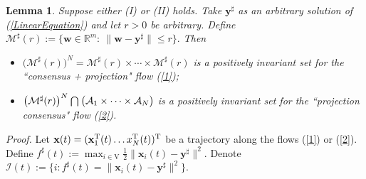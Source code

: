 \documentclass[a4paper, 11pt]{article}
\newcommand*\mcap{\mathbin{\mathpalette\mcapinn\relax}}
\newcommand*\mcapinn[2]{\vcenter{\hbox{$\mathsurround=0pt
  \ifx\displaystyle#1\textstyle\else#1\fi\bigcap$}}}
\def\T{^{\rm\tiny T}}
\newtheorem{lemma}{Lemma}
\begin{document}
\begin{lemma}\label{lem:invariant}
Suppose either (I) or (II) holds. Take $\mathbf{y}^\sharp$ as an arbitrary solution of (\ref{LinearEquation}) and let $r>0$ be arbitrary.  Define
$
\mathcal{M}^\sharp(r):=\Big\{\mathbf{w}\in\mathbb{R}^m:\ \big\|\mathbf{w}-\mathbf{y}^\sharp\big\|\leq r\Big\}.
$
Then \begin{itemize}
\item[(i)] $\big(\mathcal{M}^\sharp(r)\big)^{N}=\mathcal{M}^\sharp(r)\times \cdots \times \mathcal{M}^\sharp(r)$ is a positively invariant set for the ``consensus + projection" flow (\ref{1});
    \item[(ii)]  $\big(\mathcal{M}^\sharp(r)\big)^{N}\mcap\big(\mathcal{A}_1\times \cdots \times \mathcal{A}_N\big)$ is a positively invariant set for the ``projection consensus" flow (\ref{2}).
\end{itemize}
\end{lemma}
{\it Proof.} Let $\mathbf{x}(t)=(\mathbf{x}_1\T(t)\dots x_N\T(t))\T$ be a trajectory along the flows (\ref{1}) or (\ref{2}).  Define $
f^\sharp(t):=\max_{i\in\mathrm{V}}\frac{1}{2}\big\|\mathbf{x}_i(t)-\mathbf{y}^\sharp\big\|^2.
$
Denote $\mathcal{I}(t):=\big\{i: f^\sharp(t)=\big\|\mathbf{x}_i(t)-\mathbf{y}^\sharp\big\|^2\big\}$.
\end{document}
